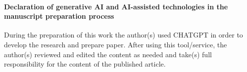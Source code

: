 \paragraph{\textbf{Declaration of generative AI and AI-assisted technologies in the manuscript preparation process}}

During the preparation of this work the author(s) used CHATGPT in order to develop the research and prepare paper. After using this tool/service, the author(s) reviewed and edited the content as needed and take(s) full responsibility for the content of the published article.
